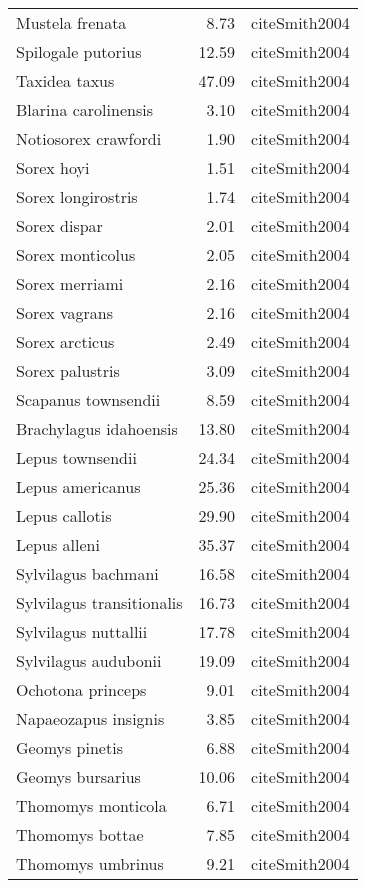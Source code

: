\begin{table}[ht]
\begin{tabular}{lrl}
  Mustela frenata & 8.73 & cite{Smith2004} \\ 
  Spilogale putorius & 12.59 & cite{Smith2004} \\ 
  Taxidea taxus & 47.09 & cite{Smith2004} \\ 
  Blarina carolinensis & 3.10 & cite{Smith2004} \\ 
  Notiosorex crawfordi & 1.90 & cite{Smith2004} \\ 
  Sorex hoyi & 1.51 & cite{Smith2004} \\ 
  Sorex longirostris & 1.74 & cite{Smith2004} \\ 
  Sorex dispar & 2.01 & cite{Smith2004} \\ 
  Sorex monticolus & 2.05 & cite{Smith2004} \\ 
  Sorex merriami & 2.16 & cite{Smith2004} \\ 
  Sorex vagrans & 2.16 & cite{Smith2004} \\ 
  Sorex arcticus & 2.49 & cite{Smith2004} \\ 
  Sorex palustris & 3.09 & cite{Smith2004} \\ 
  Scapanus townsendii & 8.59 & cite{Smith2004} \\ 
  Brachylagus idahoensis & 13.80 & cite{Smith2004} \\ 
  Lepus townsendii & 24.34 & cite{Smith2004} \\ 
  Lepus americanus & 25.36 & cite{Smith2004} \\ 
  Lepus callotis & 29.90 & cite{Smith2004} \\ 
  Lepus alleni & 35.37 & cite{Smith2004} \\ 
  Sylvilagus bachmani & 16.58 & cite{Smith2004} \\ 
  Sylvilagus transitionalis & 16.73 & cite{Smith2004} \\ 
  Sylvilagus nuttallii & 17.78 & cite{Smith2004} \\ 
  Sylvilagus audubonii & 19.09 & cite{Smith2004} \\ 
  Ochotona princeps & 9.01 & cite{Smith2004} \\ 
  Napaeozapus insignis & 3.85 & cite{Smith2004} \\ 
  Geomys pinetis & 6.88 & cite{Smith2004} \\ 
  Geomys bursarius & 10.06 & cite{Smith2004} \\ 
  Thomomys monticola & 6.71 & cite{Smith2004} \\ 
  Thomomys bottae & 7.85 & cite{Smith2004} \\ 
  Thomomys umbrinus & 9.21 & cite{Smith2004} \\ 

\end{tabular}
\end{table}
